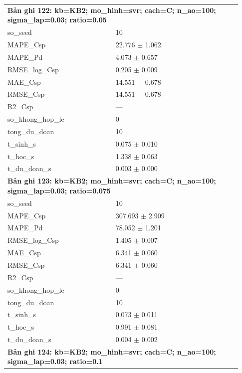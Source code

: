 \begin{longtable}{p{0.43\linewidth}p{0.50\linewidth}}
\midrule
\multicolumn{2}{p{0.95\linewidth}}{\textbf{Bản ghi 122: kb=KB2; mo\_hinh=svr; cach=C; n\_ao=100; sigma\_lap=0.03; ratio=0.05}} \\
so\_\allowbreak seed & 10 \\
MAPE\_\allowbreak Csp & 22.776 $\pm$ 1.062 \\
MAPE\_\allowbreak Pd & 4.073 $\pm$ 0.657 \\
RMSE\_\allowbreak log\_\allowbreak Csp & 0.205 $\pm$ 0.009 \\
MAE\_\allowbreak Csp & 14.551 $\pm$ 0.678 \\
RMSE\_\allowbreak Csp & 14.551 $\pm$ 0.678 \\
R2\_\allowbreak Csp & — \\
so\_\allowbreak khong\_\allowbreak hop\_\allowbreak le & 0 \\
tong\_\allowbreak du\_\allowbreak doan & 10 \\
t\_\allowbreak sinh\_\allowbreak s & 0.075 $\pm$ 0.010 \\
t\_\allowbreak hoc\_\allowbreak s & 1.338 $\pm$ 0.063 \\
t\_\allowbreak du\_\allowbreak doan\_\allowbreak s & 0.003 $\pm$ 0.000 \\
\midrule
\multicolumn{2}{p{0.95\linewidth}}{\textbf{Bản ghi 123: kb=KB2; mo\_hinh=svr; cach=C; n\_ao=100; sigma\_lap=0.03; ratio=0.075}} \\
so\_\allowbreak seed & 10 \\
MAPE\_\allowbreak Csp & 307.693 $\pm$ 2.909 \\
MAPE\_\allowbreak Pd & 78.052 $\pm$ 1.201 \\
RMSE\_\allowbreak log\_\allowbreak Csp & 1.405 $\pm$ 0.007 \\
MAE\_\allowbreak Csp & 6.341 $\pm$ 0.060 \\
RMSE\_\allowbreak Csp & 6.341 $\pm$ 0.060 \\
R2\_\allowbreak Csp & — \\
so\_\allowbreak khong\_\allowbreak hop\_\allowbreak le & 0 \\
tong\_\allowbreak du\_\allowbreak doan & 10 \\
t\_\allowbreak sinh\_\allowbreak s & 0.073 $\pm$ 0.011 \\
t\_\allowbreak hoc\_\allowbreak s & 0.991 $\pm$ 0.081 \\
t\_\allowbreak du\_\allowbreak doan\_\allowbreak s & 0.004 $\pm$ 0.002 \\
\midrule
\multicolumn{2}{p{0.95\linewidth}}{\textbf{Bản ghi 124: kb=KB2; mo\_hinh=svr; cach=C; n\_ao=100; sigma\_lap=0.03; ratio=0.1}} \\

\end{longtable}
